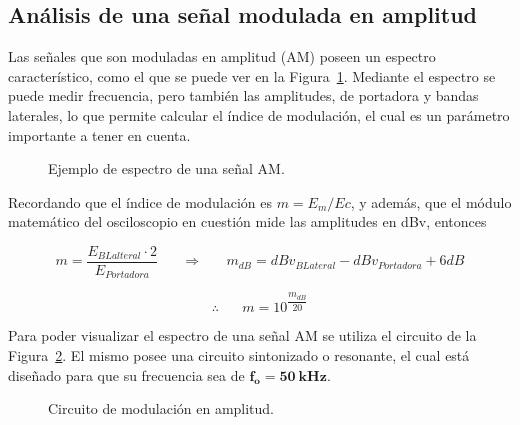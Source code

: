   \pagebreak
  \subsection{Análisis de una señal modulada en amplitud} \label{sec:Exp4_AM}
    Las señales que son moduladas en amplitud (AM) poseen un espectro característico, como el que se puede ver
    en la Figura~\ref{fig:EjemploEspectroModAM}. Mediante el espectro se puede medir frecuencia, pero también
    las amplitudes, de portadora y bandas laterales, lo que permite calcular el índice de modulación, el cual es
    un parámetro importante a tener en cuenta. 

    \begin{figure}[H]
      \centering
      \caption{Ejemplo de espectro de una señal AM.}
      \label{fig:EjemploEspectroModAM}
    \end{figure}

    Recordando que el índice de modulación es $m= E_m / Ec$, y además, que el módulo matemático del osciloscopio 
    en cuestión mide las amplitudes en dBv, entonces

    \begin{equation}
      m = \dfrac{E_{BLalteral} \cdot 2}{E_{Portadora}} \hspace{20pt}
      \Longrightarrow \hspace{20pt} m_{dB} = dBv_{BLateral} - dBv_{Portadora} + 6dB
      \label{eqn:IndiceModEndB}
    \end{equation}

    \begin{equation}
      \therefore \hspace{20pt} m=10^{\dfrac{m_{dB}}{20}}
      \label{eqn:IndiceMod}
    \end{equation}

    Para poder visualizar el espectro de una señal AM se utiliza el circuito de la Figura~\ref{fig:ModuladorAM}. 
    El mismo posee una circuito sintonizado o resonante, el cual está diseñado para que su
    frecuencia sea de $\mathbf{f_o = 50~kHz}$.

    \begin{figure}[H]
      \centering
      \caption{Circuito de modulación en amplitud.}
      \label{fig:ModuladorAM}
    \end{figure}

